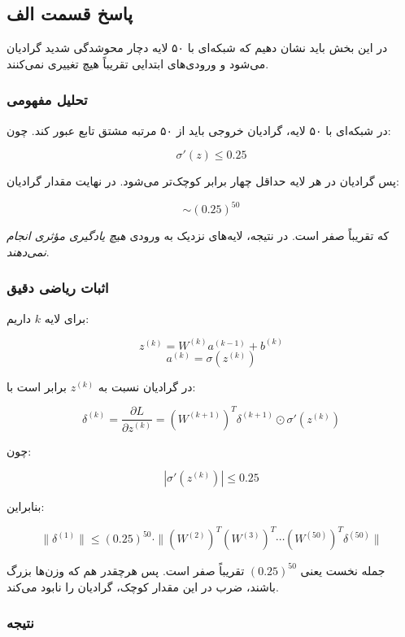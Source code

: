 \documentclass{article}
\begin{document}
\subsection{پاسخ قسمت الف}

در این بخش باید نشان دهیم که شبکه‌ای با ۵۰ لایه  دچار محوشدگی شدید گرادیان می‌شود و ورودی‌های ابتدایی تقریباً هیچ تغییری نمی‌کنند.

\subsubsection*{تحلیل مفهومی}

در شبکه‌ای با ۵۰ لایه، گرادیان خروجی باید از ۵۰ مرتبه مشتق تابع  عبور کند. چون:

\[
\sigma'(z) \leq 0.25
\]

پس گرادیان در هر لایه حداقل چهار برابر کوچک‌تر می‌شود. در نهایت مقدار گرادیان:

\[
\sim (0.25)^{50}
\]

که تقریباً صفر است.  
در نتیجه، لایه‌های نزدیک به ورودی \emph{هیچ یادگیری مؤثری انجام نمی‌دهند}.

\subsubsection*{اثبات ریاضی دقیق}

برای لایه $k$ داریم:

\[
z^{(k)} = W^{(k)} a^{(k-1)} + b^{(k)}
\]
\[
a^{(k)} = \sigma(z^{(k)})
\]

در  گرادیان نسبت به $z^{(k)}$ برابر است با:

\[
\delta^{(k)} = \frac{\partial L}{\partial z^{(k)}} = 
\left( W^{(k+1)} \right)^T \delta^{(k+1)} 
\odot 
\sigma'(z^{(k)})
\]

چون:

\[
|\sigma'(z^{(k)})| \leq 0.25
\]

بنابراین:

\[
\|\delta^{(1)}\| 
\leq
(0.25)^{50} 
\cdot
\| (W^{(2)})^T (W^{(3)})^T \cdots (W^{(50)})^T \delta^{(50)} \|
\]

جمله نخست یعنی $(0.25)^{50}$ تقریباً صفر است.  
پس هرچقدر هم که وزن‌ها بزرگ باشند، ضرب در این مقدار کوچک، گرادیان را نابود می‌کند.

\subsubsection*{نتیجه}
\end{document}
